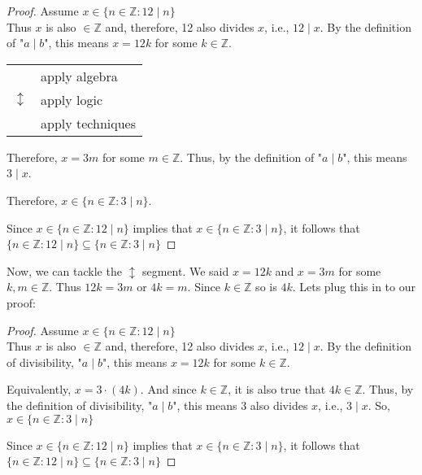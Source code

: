 \documentclass{amsart} %
\theoremstyle{definition} %
\theoremstyle{definition}
\theoremstyle{remark} %
\begin{document}
\begin{proof}
      Assume $x \in \{n \in \mathbb{Z}: 12\mid n \}$ \\
      Thus $x$ is also $\in \mathbb{Z}$ and, therefore, 12 also divides $x$, i.e., $12\mid x$. By the definition of "$a \mid  b$", this means $x=12k$ for some $k \in \mathbb{Z}$.

      \begin{center}
      \begin{tabular}{r l}
            \multirow{3}{*}{\huge $\updownarrow$} & apply algebra \\ %
            & apply logic \\
            & apply techniques \\
      \end{tabular}
      \end{center}

      Therefore, $x = 3m$ for some $m \in \mathbb{Z}$. Thus, by the definition of "$a \mid  b$", this means $3 \mid  x$.

      Therefore, $x \in \{n \in \mathbb{Z} : 3\mid n \}$.

      Since $x \in\{n \in \mathbb{Z}: 12\mid n \}$ implies that $x \in \{n \in \mathbb{Z} : 3\mid n \}$, it follows that \\ $\{n \in \mathbb{Z}: 12\mid n \} \subseteq \{n \in \mathbb{Z} : 3\mid n \}$

\end{proof}

Now, we can tackle the $\updownarrow$ segment. We said $x = 12k$ and $x = 3m$ for some $k, m \in \mathbb{Z}$. Thus $12k = 3m$ or $4k = m$. Since $k \in \mathbb{Z}$ so is $4k$. Lets plug this in to our proof:

\begin{proof}
      Assume $x \in \{n \in \mathbb{Z}: 12\mid n \}$ \\
      Thus $x$ is also $\in \mathbb{Z}$ and, therefore, 12 also divides $x$, i.e., $12\mid x$. By the definition of divisibility, "$a \mid b$", this means $x=12k$ for some $k \in \mathbb{Z}$.

      Equivalently, $x = 3\cdot(4k)$.
      And since $k \in \mathbb{Z}$, it is also true that $4k \in \mathbb{Z}$. Thus, by the definition of divisibility, "$a \mid  b$", this means 3 also divides $x$, i.e., $3 \mid x$. So, $x \in \{n \in \mathbb{Z} : 3\mid n \}$

      Since $x \in\{n \in \mathbb{Z}: 12\mid n \}$ implies that $x \in \{n \in \mathbb{Z} : 3\mid n \}$, it follows that \\ $\{n \in \mathbb{Z}: 12\mid n \} \subseteq \{n \in \mathbb{Z} : 3\mid n \}$

\end{proof}
\end{document}
